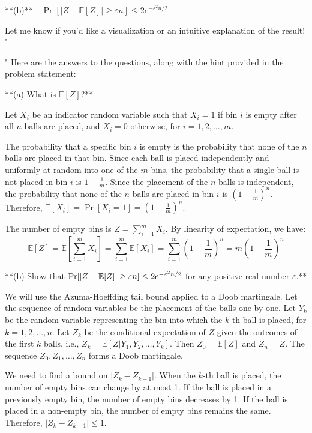 \begin{enumerate}
\begin{shaded}
**(b)** \(\Pr[|Z - \mathbb{E}[Z]| \ge \varepsilon n] \leq 2e^{-\varepsilon^2 n/2}\)

Let me know if you'd like a visualization or an intuitive explanation of the result!
"

"
Here are the answers to the questions, along with the hint provided in the problem statement:

**(a) What is $\mathbb E[Z]$?**

Let $X_i$ be an indicator random variable such that $X_i = 1$ if bin $i$ is empty after all $n$ balls are placed, and $X_i = 0$ otherwise, for $i = 1, 2, \dots, m$.

The probability that a specific bin $i$ is empty is the probability that none of the $n$ balls are placed in that bin. Since each ball is placed independently and uniformly at random into one of the $m$ bins, the probability that a single ball is not placed in bin $i$ is $1 - \frac{1}{m}$. Since the placement of the $n$ balls is independent, the probability that none of the $n$ balls are placed in bin $i$ is $(1 - \frac{1}{m})^n$.
Therefore, $\mathbb E[X_i] = \Pr[X_i = 1] = (1 - \frac{1}{m})^n$.

The number of empty bins is $Z = \sum_{i=1}^m X_i$. By linearity of expectation, we have:
$$ \mathbb E[Z] = \mathbb E\left[\sum_{i=1}^m X_i\right] = \sum_{i=1}^m \mathbb E[X_i] = \sum_{i=1}^m \left(1 - \frac{1}{m}\right)^n = m \left(1 - \frac{1}{m}\right)^n $$

**(b) Show that $\Pr[|Z - \mathbb{E}[Z]| \ge \varepsilon n] \leq 2e^{-\varepsilon^2 n/2}$ for any positive real number $\varepsilon$.**

We will use the Azuma-Hoeffding tail bound applied to a Doob martingale. Let the sequence of random variables be the placement of the balls one by one. Let $Y_k$ be the random variable representing the bin into which the $k$-th ball is placed, for $k = 1, 2, \dots, n$. Let $Z_k$ be the conditional expectation of $Z$ given the outcomes of the first $k$ balls, i.e., $Z_k = \mathbb E[Z | Y_1, Y_2, \dots, Y_k]$.
Then $Z_0 = \mathbb E[Z]$ and $Z_n = Z$. The sequence $Z_0, Z_1, \dots, Z_n$ forms a Doob martingale.

We need to find a bound on $|Z_k - Z_{k-1}|$. When the $k$-th ball is placed, the number of empty bins can change by at most 1. If the ball is placed in a previously empty bin, the number of empty bins decreases by 1. If the ball is placed in a non-empty bin, the number of empty bins remains the same. Therefore, $|Z_k - Z_{k-1}| \leq 1$.


\end{shaded}
\end{enumerate}

